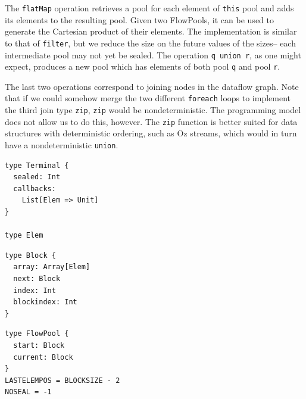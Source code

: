 The \verb=flatMap= operation retrieves a pool for each element of
\verb=this= pool and adds its elements to the resulting pool.
Given two FlowPools, it can be used to generate the Cartesian product
of their elements.
The implementation is similar to that of \verb=filter=,
but we reduce the size on the future values of the sizes-- each
intermediate pool may not yet be sealed.
The operation \verb=q union r=, as one might expect, produces a new
pool which has elements of both pool \verb=q= and pool \verb=r=.

The last two operations correspond to joining nodes in the dataflow
graph.
Note that if we could somehow merge the two different \verb=foreach=
loops to implement the third join type \verb=zip=, \verb=zip= would
be nondeterministic.
The programming model does not allow us to do this, however.
The \verb=zip= function is better suited for data structures with deterministic ordering,
such as Oz streams, which would in turn have a nondeterministic \verb=union=.




\begin{minipage}[t]{4.3 cm}
\begin{verbatim}
type Terminal {
  sealed: Int
  callbacks:
    List[Elem => Unit]
}

type Elem
\end{verbatim}
\end{minipage}
\begin{minipage}[t]{4 cm}
\begin{verbatim}
type Block {
  array: Array[Elem]
  next: Block
  index: Int
  blockindex: Int
}
\end{verbatim}
\end{minipage}
\begin{minipage}[t]{5 cm}
\begin{verbatim}
type FlowPool {
  start: Block
  current: Block
}
LASTELEMPOS = BLOCKSIZE - 2
NOSEAL = -1
\end{verbatim}
\end{minipage}




